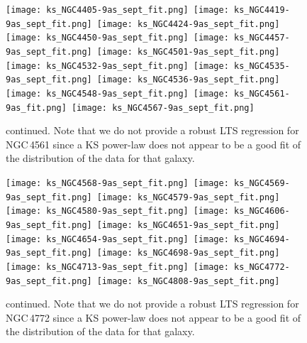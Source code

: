 \documentclass[longauth]{aa}
\begin{document}
\begin{figure*}

\texttt{[image: ks\_NGC4405-9as\_sept\_fit.png]}\, \texttt{[image: ks\_NGC4419-9as\_sept\_fit.png]}\,
\texttt{[image: ks\_NGC4424-9as\_sept\_fit.png]}\\

\texttt{[image: ks\_NGC4450-9as\_sept\_fit.png]}\, \texttt{[image: ks\_NGC4457-9as\_sept\_fit.png]}\,
\texttt{[image: ks\_NGC4501-9as\_sept\_fit.png]}\\ 

\texttt{[image: ks\_NGC4532-9as\_sept\_fit.png]}\, \texttt{[image: ks\_NGC4535-9as\_sept\_fit.png]}\,
\texttt{[image: ks\_NGC4536-9as\_sept\_fit.png]}\\

\texttt{[image: ks\_NGC4548-9as\_sept\_fit.png]}\, \texttt{[image: ks\_NGC4561-9as\_fit.png]}\,
\texttt{[image: ks\_NGC4567-9as\_sept\_fit.png]}\\
\caption{continued. Note that we do not provide a robust LTS regression for NGC\,4561 since a KS power-law does not appear to be a good fit of the distribution of the data for that galaxy.}
\end{figure*}

\renewcommand\thefigure{\arabic{figure}}
\setcounter{figure}{4}

\begin{figure*}

\texttt{[image: ks\_NGC4568-9as\_sept\_fit.png]}\, \texttt{[image: ks\_NGC4569-9as\_sept\_fit.png]}\,
\texttt{[image: ks\_NGC4579-9as\_sept\_fit.png]}\\ 

\texttt{[image: ks\_NGC4580-9as\_sept\_fit.png]}\, \texttt{[image: ks\_NGC4606-9as\_sept\_fit.png]}\,
\texttt{[image: ks\_NGC4651-9as\_sept\_fit.png]}\\ 

\texttt{[image: ks\_NGC4654-9as\_sept\_fit.png]}\, \texttt{[image: ks\_NGC4694-9as\_sept\_fit.png]}\,
\texttt{[image: ks\_NGC4698-9as\_sept\_fit.png]}\\ 

\texttt{[image: ks\_NGC4713-9as\_sept\_fit.png]}\, \texttt{[image: ks\_NGC4772-9as\_sept\_fit.png]}\,
\texttt{[image: ks\_NGC4808-9as\_sept\_fit.png]}\\
\caption{continued. Note that we do not provide a robust LTS regression for NGC\,4772 since a KS power-law does not appear to be a good fit of the distribution of the data for that galaxy.}
\end{figure*}
   
\end{document}
